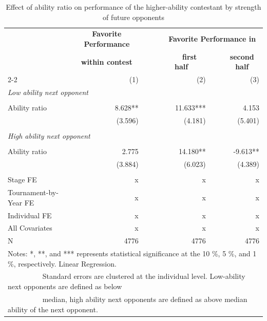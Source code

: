 \documentclass[11pt,a4paper]{article}
\begin{document}
\newpage

\begin{table}[H]
		\centering
		\caption{Effect of ability ratio on performance of the higher-ability contestant by strength of future opponents} 
		\label{apptab:table_resource}
		\begin{tabular}{l r r r r r } 
			\toprule
			\toprule
			& \multicolumn{1}{c}{\textbf{Favorite Performance}} & ~~~ &  \multicolumn{3}{c}{\textbf{ Favorite Performance in }} \\
   			& \multicolumn{1}{c}{\textbf{within contest}} & ~~~ &  \multicolumn{1}{c}{\textbf{~~first half~~}} & ~ & \multicolumn{1}{c}{\textbf{second half}} \\
            \cline{2-2} \cline{4-6} \rule{0pt}{3ex}   
			        & (1)        & ~ & (2)   & ~ & (3)     \\ 
			\midrule 		
			\multicolumn{6}{l}{\textit{Low ability next opponent}}      \\
            \rule{0pt}{0.01ex}\\
			Ability ratio            & 8.628**   & & 11.633***   & & 4.153   \\
			                         & (3.596)   & & (4.181)     & & (5.401)  \\         
            \rule{0pt}{0.3ex}\\
            \multicolumn{6}{l}{\textit{High ability next opponent}}      \\
            \rule{0pt}{0.01ex}\\
			Ability ratio            & 2.775   & & 14.180**   & & -9.613**   \\
			                         & (3.884)   & & (6.023)     & & (4.389)  \\
            \rule{0pt}{0.3ex}\\
			\midrule
			Stage FE ~~ & x  & & x & & x  \\ 
			Tournament-by-Year FE    & x  & & x & & x  \\ 
			Individual FE            & x  & & x & & x  \\ 
			All Covariates           & x  & & x & & x  \\
			\midrule 
			N                        &  4776    & &  4776   & &   4776   \\ 
			\bottomrule
			\bottomrule
			\multicolumn{6}{l}{\footnotesize Notes: *, **, and *** represents statistical significance at the 10 \%, 5 \%, and 1 \%, respectively. Linear Regression.}\\
			\multicolumn{6}{l}{\footnotesize ~~~~~~~~~ Standard errors are clustered at the individual level. Low-ability next opponents are defined as below }\\
			\multicolumn{6}{l}{\footnotesize ~~~~~~~~~ median, high ability next opponents are defined as above median ability of the next opponent.}
		\end{tabular}
	\end{table}
\end{document}

